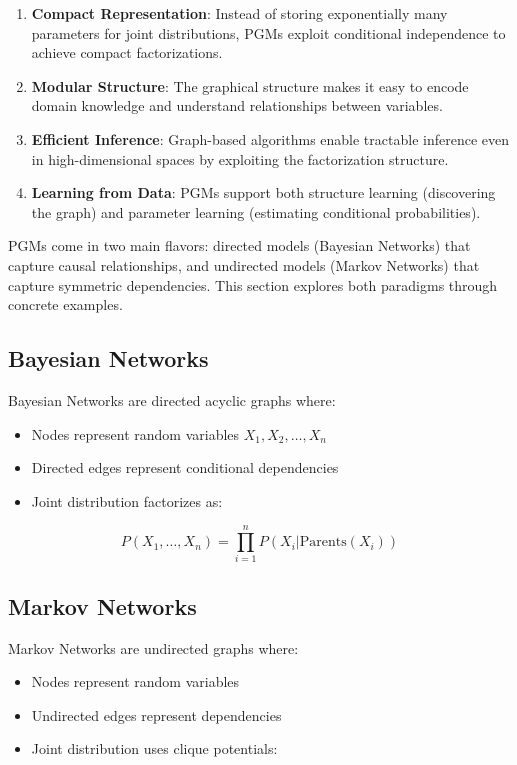 \documentclass[conference]{IEEEtran}
\begin{document}
\begin{enumerate}
    \item \textbf{Compact Representation}: Instead of storing exponentially many parameters for joint distributions, PGMs exploit conditional independence to achieve compact factorizations.
    
    \item \textbf{Modular Structure}: The graphical structure makes it easy to encode domain knowledge and understand relationships between variables.
    
    \item \textbf{Efficient Inference}: Graph-based algorithms enable tractable inference even in high-dimensional spaces by exploiting the factorization structure.
    
    \item \textbf{Learning from Data}: PGMs support both structure learning (discovering the graph) and parameter learning (estimating conditional probabilities).
\end{enumerate}

PGMs come in two main flavors: directed models (Bayesian Networks) that capture causal relationships, and undirected models (Markov Networks) that capture symmetric dependencies. This section explores both paradigms through concrete examples.

\subsection{Bayesian Networks}

Bayesian Networks are directed acyclic graphs where:
\begin{itemize}
    \item Nodes represent random variables $X_1, X_2, \ldots, X_n$
    \item Directed edges represent conditional dependencies
    \item Joint distribution factorizes as:
\end{itemize}

\begin{equation}
P(X_1, \ldots, X_n) = \prod_{i=1}^{n} P(X_i | \text{Parents}(X_i))
\end{equation}

\subsection{Markov Networks}

Markov Networks are undirected graphs where:
\begin{itemize}
    \item Nodes represent random variables
    \item Undirected edges represent dependencies
    \item Joint distribution uses clique potentials:
\end{itemize}
\end{document}

